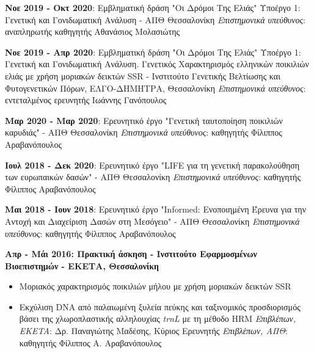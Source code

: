 \documentclass[12pt,]{scrartcl}
\begin{document}
\textbf{Νοε 2019 - Οκτ 2020}: Εμβληματική δράση "Οι Δρόμοι Της Ελιάς" Υποέργο 1: Γενετική και Γονιδωματική Ανάλυση - ΑΠΘ Θεσσαλονίκη
\vspace{2mm}
\newline
\textit{Επιστημονικά υπεύθυνος}: αναπληρωτής καθηγητής Αθανάσιος Μολασιώτης

\textbf{Νοε 2019 - Απρ 2020}: Εμβληματική δράση "Οι Δρόμοι Της Ελιάς" Υποέργο 1: Γενετική και Γονιδωματική Ανάλυση. Γενετικός Χαρακτηρισμός ελληνικών ποικιλιών ελιάς με χρήση μοριακών δεικτών SSR - Ινστιτούτο Γενετικής Βελτίωσης και Φυτογενετικών Πόρων, ΕΛΓΟ-ΔΗΜΗΤΡΑ, Θεσσαλονίκη
\vspace{2mm}
\newline
\textit{Επιστημονικά υπεύθυνος}: εντεταλμένος ερευνητής Ιωάννης Γανόπουλος

\textbf{Μαρ 2020 - Μαρ 2020}: Ερευνητικό έργο "Γενετική ταυτοποίηση ποικιλιών καρυδιάς" - ΑΠΘ Θεσσαλονίκη
\vspace{2mm}
\newline
\textit{Επιστημονικά υπεύθυνος}: καθηγητής Φίλιππος Αραβανόπουλος

\textbf{Ιουλ 2018 - Δεκ 2020}: Ερευνητικό έργο "LIFE για τη γενετική παρακολούθηση των ευρωπαικών δασών" - ΑΠΘ Θεσσαλονίκη
\vspace{2mm}
\newline
\textit{Επιστημονικά υπεύθυνος}: καθηγητής Φίλιππος Αραβανόπουλος

\textbf{Μαι 2018 - Ιουν 2018}: Ερευνητικό έργο "Informed: Ενοποιημένη Έρευνα για την Αντοχή και Διαχείριση Δασών στη Μεσόγειο" - ΑΠΘ Θεσσαλονίκη
\vspace{2mm}
\newline
\textit{Επιστημονικά υπεύθυνος}: καθηγητής Φίλιππος Αραβανόπουλος

\vspace{3mm}
\textbf{Απρ - Μάι 2016: Πρακτική άσκηση - Ινστιτούτο Εφαρμοσμένων Βιοεπιστημών - ΕΚΕΤΑ, Θεσσαλονίκη}


\vspace{3mm}
\begin{itemize}
\vspace{-3mm}
\setlength\itemsep{-0.6em}
\item Μοριακός χαρακτηρισμός ποικιλιών μήλου με χρήση μοριακών δεικτών SSR 
\item Εκχύλιση DNA από παλαιωμένη ξυλεία πεύκης και ταξινομικός προσδιορισμός βάσει της χλωροπλαστικής αλληλουχίας \textit{trnL} με τη μέθοδο HRM
\vspace{2mm}
\newline
\textit{Επιβλέπων, EKETA}: Δρ. Παναγιώτης Μαδέσης, Κύριος Ερευνητής
\newline
\textit{Επιβλέπων, ΑΠΘ}: καθηγητής Φίλιππος Α. Αραβανόπουλος
\end{itemize}
\end{document}
